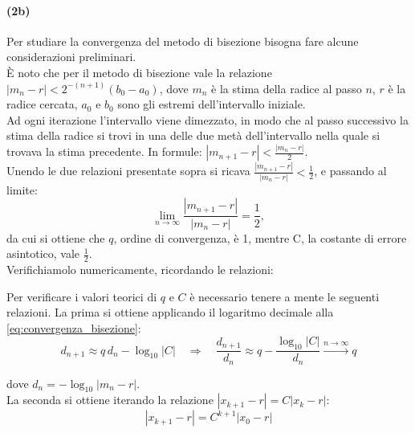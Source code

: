 \documentclass[letterpaper, 12pt]{article}
\begin{document}
\paragraph{(2b) } Per studiare la convergenza del metodo di bisezione bisogna fare alcune considerazioni 
preliminari. \\
È noto che per il metodo di bisezione vale la relazione $ |m_n-r|< 2^{-(n+1)} (b_0-a_0) $, dove $m_n$ è 
la stima della radice al passo $n$, $r$ è la radice cercata, $a_0$ e $b_0$ sono gli estremi dell'intervallo 
iniziale. \\
Ad ogni iterazione l'intervallo viene dimezzato, in modo che al passo successivo la stima della radice si trovi
in una delle due metà dell'intervallo nella quale si trovava la stima precedente. In formule: 
$|m_{n+1}-r| <\frac{|m_n-r|}{2}$. \\
Unendo le due relazioni presentate sopra si ricava $\frac{|m_{n+1}-r|}{|m_n-r|} < \frac{1}{2}$, e passando al 
limite: 
\begin{equation}
    \label{eq:convergenza_bisezione}
    \lim_{n\to\infty} \frac{|m_{n+1}-r|}{|m_n-r|} = \frac{1}{2}, 
\end{equation}
da cui si ottiene che $q$, ordine di convergenza, 
è 1, mentre C, la costante di errore asintotico, vale $\frac{1}{2}$. \\
Verifichiamolo numericamente, ricordando le relazioni: 

Per verificare i valori teorici di $q$ e $C$ è necessario tenere a mente le seguenti relazioni. La prima si ottiene
applicando il logaritmo decimale alla \ref{eq:convergenza_bisezione}:
\begin{equation}
    \label{eq:convergenza_bisezione_log}
    d_{n+1} \approx q\, d_n - \log_{10}|C|
    \quad\Rightarrow\quad
    \frac{d_{n+1}}{d_n} \approx q - \frac{\log_{10}|C|}{d_n}
    \overset{n\to\infty}{\longrightarrow} q
\end{equation}

dove $d_n = -\log_{10}|m_n - r|$. \\
La seconda si ottiene iterando la relazione  $ |x_{k+1} - r|= C |x_{k} - r|$:
\begin{equation}
    |x_{k+1} - r|= C^{k+1} |x_{0} - r|
\end{equation}
\end{document}
